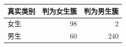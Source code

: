 \begin{tabular}{lrr}
\toprule
真实类别 & 判为女生簇 & 判为男生簇 \\
\midrule
女生 & 98 & 2 \\
男生 & 60 & 240 \\
\bottomrule
\end{tabular}
